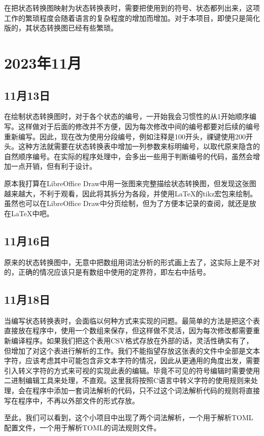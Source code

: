 在把状态转换图映射为状态转换表时，需要把使用到的符号、状态都列出来，这项工作的繁琐程度会随着语言的复杂程度的增加而增加。对于本项目，即使只是简化版的，其状态转换图已经有些繁琐。


\section{2023年11月}


\subsection{11月13日}
在绘制状态转换图时，对于各个状态的编号，一开始我会习惯性的从1开始顺序编写。这样做对于后面的修改并不方便，因为每次修改中间的编号都要对后续的编号重新编写。因此，现在改为使用分段编号，例如注释是100开头，祼键使用200开头。这种方法就需要在状态转换表中增加一列参数来标明编号，以取代原来隐含的自然顺序编号。在实际的程序处理中，会多出一些用于判断编号的代码，虽然会增加一点开销，但有利于设计。

原本我打算在LibreOffice Draw中用一张图来完整描绘状态转换图，但发现这张图越来越大，不利于观看，因此将其拆分为各段，并使用LaTeX的tikz宏包来绘制。虽然也可以在LibreOffice Draw中分页绘制，但为了方便本记录的查阅，就还是放在LaTeX中吧。


\subsection{11月16日}
原来的状态转换图中，无意中把数组用词法分析的形式画上去了，这实际上是不对的，正确的情况应该只是有数组中使用的定界符，即左右中括号。


\subsection{11月18日}
当编写状态转换表时，会面临以何种方式来实现的问题。最简单的方法是把这个表直接放在程序中，使用一个数组来保存，但这样做不灵活，因为每次修改都需要重新编译程序。如果我们把这个表用CSV格式存放在外部的话，灵活性确实有了，但增加了对这个表进行解析的工作。我们不能指望存放这张表的文件中全部是文本字符，应该考虑其中可能包含非文本字符的情况，因此从更通用的角度出发，需要引入转义字符的方式来可视的实现此表的编辑。毕竟不可见的符号编辑时需要使用二进制编辑工具来处理，不直观。这里我将按照C语言中转义字符的使用规则来处理，会在程序中添加一套词法解析的代码，只不过这个词法解析代码的规则将直接写在程序中，不再以外部文件的形式存放。

至此，我们可以看到，这个小项目中出现了两个词法解析，一个用于解析TOML配置文件，一个用于解析TOML的词法规则文件。


